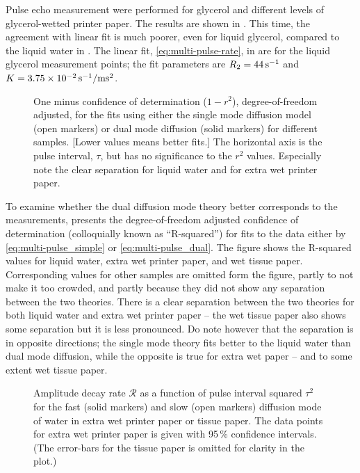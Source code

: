 \documentclass[11pt,a4paper, twocolumn,
swedish, english %
]{article}
\begin{document}
Pulse echo measurement were performed for glycerol and
different levels of glycerol-wetted printer paper. The results are
shown in . This time, the agreement with linear fit
is much poorer, even for liquid glycerol, compared to the liquid water
in . The linear fit,
\eqref{eq:multi-pulse-rate}, in  are for the liquid
glycerol measurement points; the fit parameters are
$R_2=\unit[44]{s^{-1}}$ and
$K=\unit[3.75\times10^{-2}]{s^{-1}/ms^2}$.


\begin{figure*}
\centering

\caption{One minus confidence of determination ($1-r^2$),
  degree-of-freedom adjusted, for the fits using either the single
  mode diffusion model (open markers) or dual mode diffusion (solid
  markers) for different samples. [Lower values means better fits.]
  The horizontal axis is the pulse interval, $\tau$, but has no
  significance to the $r^2$ values. Especially note the clear
  separation for liquid water and for extra wet printer paper.
} 
\label{fig:good-fit}
\end{figure*}

To examine whether the dual diffusion mode theory better corresponds
to the measurements,  presents the
degree-of-freedom adjusted confidence of determination (colloquially
known as ``R-squared'') for fits to the data either by
\eqref{eq:multi-pulse_simple} or \eqref{eq:multi-pulse_dual}. The
figure shows the R-squared values for liquid water, extra wet
printer paper, and wet tissue paper. Corresponding values for other
samples are omitted form the figure, partly to not make it too
crowded, and partly because they did not show any separation between
the two theories. There is a clear separation between the two theories for
both liquid water and extra wet printer paper -- the wet tissue paper
also shows some separation but it is less
pronounced. Do note however that the separation is in opposite
directions; the single mode theory fits better to the liquid water
than dual mode diffusion, while the opposite is true for extra wet
paper -- and to some extent wet tissue paper. 


\begin{figure*}
\centering

\caption{Amplitude decay rate $\mathcal{R}$ as a function of pulse
  interval squared $\tau^2$ for the fast (solid markers) and slow
  (open markers) diffusion mode of water in extra wet printer paper or
  tissue paper. The data points for extra wet printer paper is given
  with 95\,\% confidence intervals. (The error-bars for the tissue
  paper is omitted for clarity in the plot.) } 
\label{fig:dual-diff}
\end{figure*}
\end{document}
